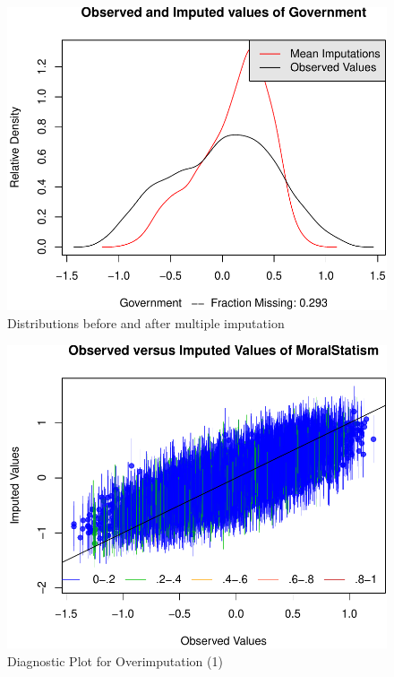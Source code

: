 \documentclass[12pt,]{article}
\begin{document}
\begin{figure}[htbp]
\centering
\includegraphics{figures/missing3-1.pdf}
\caption{Distributions before and after multiple imputation}
\end{figure}

\clearpage

\begin{figure}[htbp]
\centering
\includegraphics{figures/missing4-1.pdf}
\caption{Diagnostic Plot for Overimputation (1)}
\end{figure}
\end{document}
